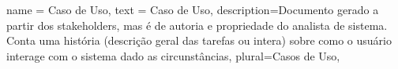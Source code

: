 

{
	name = Caso de Uso,
	text = Caso de Uso,
	description={Documento gerado a partir dos stakeholders, mas é de autoria e propriedade do analista de sistema. Conta uma história (descrição geral das tarefas ou intera\cc{}) sobre como o usuário interage com o sistema dado as circunst\^ancias},
	plural=Casos de Uso,
}